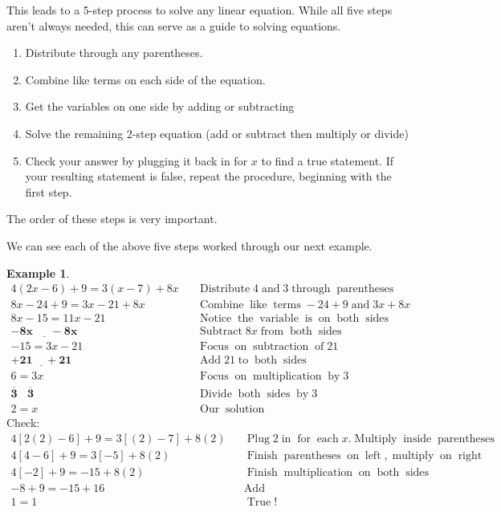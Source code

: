 \documentclass[12pt]{book}
\theoremstyle{definition}
\newtheorem{example}{Example}
\newcommand{\tmmathbf}[1]{\ensuremath{\boldsymbol{#1}}}
\newcommand{\tmop}[1]{\ensuremath{\operatorname{#1}}}
\begin{document}
This leads to a 5-step process to solve any linear equation. While all five steps aren't always needed, this can serve as a guide to solving equations.
\begin{enumerate}
  \item Distribute through any parentheses.
  \item Combine like terms on each side of the equation.
  \item Get the variables on one side by adding or subtracting
  \item Solve the remaining 2-step equation (add or subtract then multiply or divide)
  \item Check your answer by plugging it back in for $x$ to find a true statement.  If your resulting statement is false, repeat the procedure, beginning with the first step.
\end{enumerate}
 The order of these steps is very important.\par
We can see each of the above five steps worked through our next example.
\begin{example}\label{Lin26}
  \begin{eqnarray*}
    4 (2 x - 6) + 9 = 3 (x - 7) + 8 x &  & \tmop{Distribute} 4 \tmop{and} 3
    \tmop{through} \tmop{parentheses}\\
    8 x - 24 + 9 = 3 x - 21 + 8 x &  & \tmop{Combine} \tmop{like} \tmop{terms}
    - 24 + 9 \tmop{and} 3 x + 8 x\\
    8 x - 15 = 11 x - 21 &  & \tmop{Notice} \tmop{the} \tmop{variable}
    \tmop{is} \tmop{on} \tmop{both} \tmop{sides}\\
    \tmmathbf{\underline{- 8 x ~~~~~~~- 8 x}}~~~~~~~  &  & \tmop{Subtract} 8 x \tmop{from}
    \tmop{both} \tmop{sides}\\
    - 15 = 3 x - 21 &  & \tmop{Focus} \tmop{on} \tmop{subtraction} \tmop{of}
    21\\
    \tmmathbf{\underline{+ 21 ~~~~~+ 21}}  &  & \tmop{Add} 21 \tmop{to} \tmop{both}
    \tmop{sides}\\
    6 = 3 x &  & \tmop{Focus} \tmop{on} \tmop{multiplication} \tmop{by} 3\\
    \tmmathbf{\overline{3} ~~~~ \overline{3} }~  &  & \tmop{Divide} \tmop{both}
    \tmop{sides} \tmop{by} 3\\
    2 = x &  & \tmop{Our} \tmop{solution}
  \end{eqnarray*}
  Check:
  \begin{eqnarray*}
    4 [2 (2) - 6] + 9 = 3 [(2) - 7] + 8 (2) &  & \tmop{Plug} 2 \tmop{in}
    \tmop{for} \tmop{each} x. \tmop{Multiply} \tmop{inside}
    \tmop{parentheses}\\
    4 [4 - 6] + 9 = 3 [- 5] + 8 (2)  &  & \tmop{Finish} \tmop{parentheses}
    \tmop{on} \tmop{left}, \tmop{multiply} \tmop{on} \tmop{right}\\
    4 [- 2] + 9 = - 15 + 8 (2)  &  & \tmop{Finish} \tmop{multiplication}
    \tmop{on} \tmop{both} \tmop{sides}\\
    - 8 + 9 = - 15 + 16 &  & \tmop{Add}\\
    1 = 1 &  & \tmop{True} !
  \end{eqnarray*}
\end{example}
\end{document}
